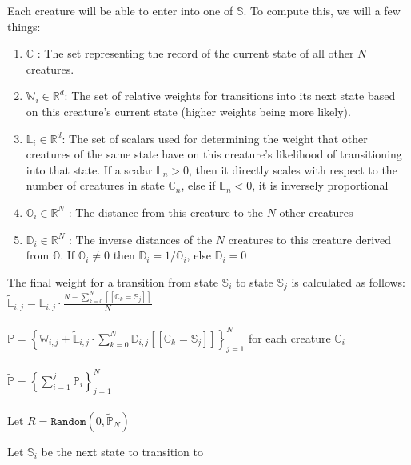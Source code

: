 \documentclass{article}
\newcommand{\ind}[1]{\ensuremath{[\![#1]\!]}}
\begin{document}
Each creature will be able to enter into one of $\mathbb{S}$. To compute this, we will a few things:
\begin{enumerate}
    \item $\mathbb{C}$ : The set representing the record of the current state of all other $N$ creatures. 
    \item $\mathbb{W}_i \in \mathbb{R}^d$: The set of relative weights for transitions into its next state based on this creature's current state (higher weights being more likely). 
    \item $\mathbb{L}_i \in \mathbb{R}^d$: The set of scalars used for determining the weight that other creatures of the same state have on this creature's likelihood of transitioning into that state.  If a scalar $\mathbb{L}_n > 0$, then it directly scales with respect to the number of creatures in state $\mathbb{C}_n$, else if $\mathbb{L}_n < 0$, it is inversely proportional 
    \item $\mathbb{O}_i \in \mathbb{R}^N$ : The distance from this creature to the $N$ other creatures
    \item $\mathbb{D}_i \in \mathbb{R}^N$ : The inverse distances of the $N$ creatures to this creature derived from $\mathbb{O}$. If $\mathbb{O}_i \neq 0$ then $\mathbb{D}_i = 1 / \mathbb{O}_i$, else $\mathbb{D}_i = 0$
\end{enumerate}

The final weight for a transition from state $\mathbb{S}_i$ to state $\mathbb{S}_j$ is calculated as follows:\\

$\widetilde{\mathbb{L}}_{i,j} = \mathbb{L}_{i,j} \cdot \frac{N - \sum^{N}_{k = 0} \ind{\mathbb{C}_k = \mathbb{S}_j}}{N}$\\\\

$\mathbb{P} = {\left\{\mathbb{W}_{i,j} + \widetilde{\mathbb{L}}_{i,j} \cdot \sum^{N}_{k = 0} \mathbb{D}_{i,j} \ind{\mathbb{C}_k = \mathbb{S}_j}\right\}}_{j = 1}^N$ for each creature $\mathbb{C}_i$\\\\

$\widetilde{\mathbb{P}} = {\left\{ \sum_{i=1}^j \mathbb{P}_i \right\}}^N_{j=1}$\\\\

Let $R = \texttt{Random}(0, \widetilde{\mathbb{P}}_N)$

\begin{algorithm}
    \begin{algorithmic}[1]
                \State Let $\mathbb{S}_i$ be the next state to transition to
            \EndIf
        \EndFor
    \end{algorithmic}
\end{algorithm}
\end{document}
